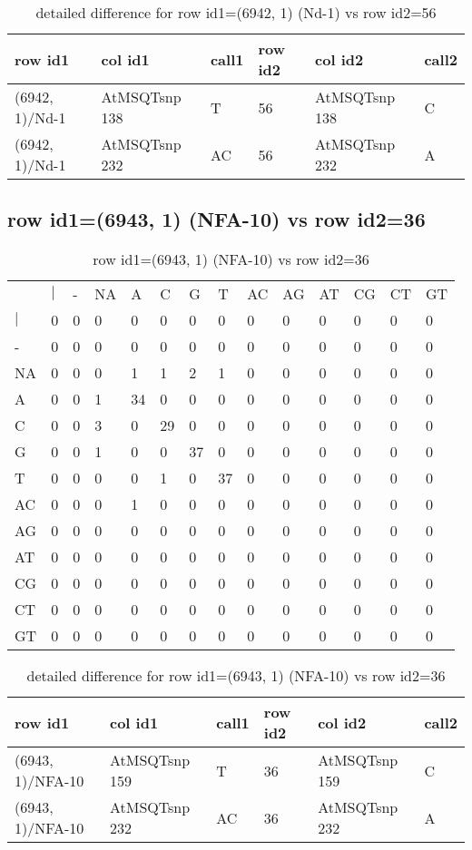 \begin{center}
\begin{longtable}{|l|l|l|l|l|l|}
\caption{detailed difference for row id1=(6942, 1) (Nd-1) vs row id2=56} \label{table_dm151}\\
\hline
row id1&col id1&call1&row id2&col id2&call2\\
\hline
(6942, 1)/Nd-1&AtMSQTsnp 138&T&56&AtMSQTsnp 138&C\\
(6942, 1)/Nd-1&AtMSQTsnp 232&AC&56&AtMSQTsnp 232&A\\
\hline
\end{longtable}
\end{center}

\subsection{row id1=(6943, 1) (NFA-10) vs row id2=36}
\begin{center}
\begin{longtable}{|l|l|l|l|l|l|l|l|l|l|l|l|l|l|}
\caption{row id1=(6943, 1) (NFA-10) vs row id2=36} \label{table_dm152}\\
\hline
\\
\hline
&$|$&-&NA&A&C&G&T&AC&AG&AT&CG&CT&GT\\
$|$&0&0&0&0&0&0&0&0&0&0&0&0&0\\
-&0&0&0&0&0&0&0&0&0&0&0&0&0\\
NA&0&0&0&1&1&2&1&0&0&0&0&0&0\\
A&0&0&1&34&0&0&0&0&0&0&0&0&0\\
C&0&0&3&0&29&0&0&0&0&0&0&0&0\\
G&0&0&1&0&0&37&0&0&0&0&0&0&0\\
T&0&0&0&0&1&0&37&0&0&0&0&0&0\\
AC&0&0&0&1&0&0&0&0&0&0&0&0&0\\
AG&0&0&0&0&0&0&0&0&0&0&0&0&0\\
AT&0&0&0&0&0&0&0&0&0&0&0&0&0\\
CG&0&0&0&0&0&0&0&0&0&0&0&0&0\\
CT&0&0&0&0&0&0&0&0&0&0&0&0&0\\
GT&0&0&0&0&0&0&0&0&0&0&0&0&0\\
\hline
\end{longtable}
\end{center}

\begin{center}
\begin{longtable}{|l|l|l|l|l|l|}
\caption{detailed difference for row id1=(6943, 1) (NFA-10) vs row id2=36} \label{table_dm153}\\
\hline
row id1&col id1&call1&row id2&col id2&call2\\
\hline
(6943, 1)/NFA-10&AtMSQTsnp 159&T&36&AtMSQTsnp 159&C\\
(6943, 1)/NFA-10&AtMSQTsnp 232&AC&36&AtMSQTsnp 232&A\\
\hline
\end{longtable}
\end{center}

